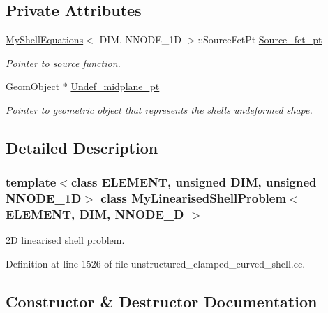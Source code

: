 \subsection*{Private Attributes}
\begin{DoxyCompactItemize}
\item 
\hyperlink{classoomph_1_1MyShellEquations}{My\+Shell\+Equations}$<$ D\+IM, N\+N\+O\+D\+E\+\_\+1D $>$\+::Source\+Fct\+Pt \hyperlink{classMyLinearisedShellProblem_a55fd5e4ce59d478cb41bd8457e868dea}{Source\+\_\+fct\+\_\+pt}
\begin{DoxyCompactList}\small\item\em Pointer to source function. \end{DoxyCompactList}\item 
Geom\+Object $\ast$ \hyperlink{classMyLinearisedShellProblem_a18e84aab4a7fad179e35d381e61c4584}{Undef\+\_\+midplane\+\_\+pt}
\begin{DoxyCompactList}\small\item\em Pointer to geometric object that represents the shell\textquotesingle{}s undeformed shape. \end{DoxyCompactList}\end{DoxyCompactItemize}


\subsection{Detailed Description}
\subsubsection*{template$<$class E\+L\+E\+M\+E\+NT, unsigned D\+IM, unsigned N\+N\+O\+D\+E\+\_\+1D$>$\newline
class My\+Linearised\+Shell\+Problem$<$ E\+L\+E\+M\+E\+N\+T, D\+I\+M, N\+N\+O\+D\+E\+\_\+D $>$}

2D linearised shell problem. 

Definition at line 1526 of file unstructured\+\_\+clamped\+\_\+curved\+\_\+shell.\+cc.



\subsection{Constructor \& Destructor Documentation}
\mbox{\label{classMyLinearisedShellProblem_a2ccc4ed3e631ca68d1d86423ef8eeb03}} 
